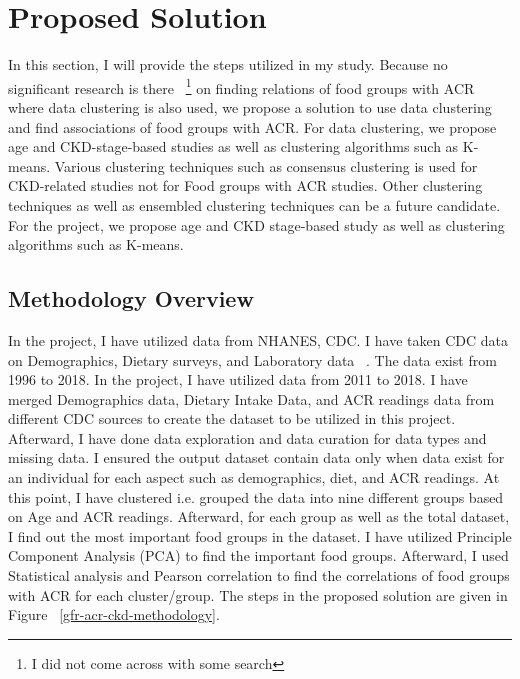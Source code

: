 \section{Proposed Solution}
In this section, I will provide the steps utilized in my study. Because no significant research is there ~\footnote{I did not come across with some search} on finding relations of food groups with ACR where data clustering is also used, we propose a solution to use data clustering and find associations of food groups with ACR. For data clustering, we propose age and CKD-stage-based studies as well as clustering algorithms such as K-means. Various clustering techniques such as consensus clustering is used for CKD-related studies not for Food groups with ACR studies. Other clustering techniques as well as ensembled clustering techniques can be a future candidate. For the project, we propose age and CKD stage-based study as well as clustering algorithms such as K-means.

\subsection{Methodology Overview}
\flushleft \justifying In the project, I have utilized data from NHANES, CDC. I have taken CDC data on Demographics, Dietary surveys, and Laboratory data ~\cite{CDCDataset}. The data exist from 1996 to 2018. In the project, I have utilized data from 2011 to 2018. I have merged Demographics data, Dietary Intake Data, and ACR readings data from different CDC sources to create the dataset to be utilized in this project. Afterward, I have done data exploration and data curation for data types and missing data. I ensured the output dataset contain data only when data exist for an individual for each aspect such as demographics, diet, and ACR readings. At this point, I have clustered i.e. grouped the data into nine different groups based on Age and ACR readings. Afterward, for each group as well as the total dataset, I find out the most important food groups in the dataset. I have utilized Principle Component Analysis (PCA) to find the important food groups. Afterward, I used Statistical analysis and Pearson correlation to find the correlations of food groups with ACR for each cluster/group. The steps in the proposed solution are given in Figure ~\ref{gfr-acr-ckd-methodology}.

